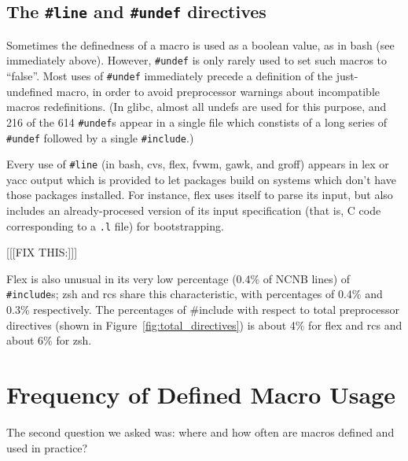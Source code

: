 \documentclass[11pt]{article}
\begin{document}
\subsection{The {\tt \#line} and {\tt \#undef} directives}

Sometimes the definedness of a macro is used as a boolean value, as in bash
(see immediately above).  However, {\tt \#undef} is only rarely used to set
such macros to ``false''.  Most uses of {\tt \#undef} immediately precede a
definition of the just-undefined macro, in order to avoid preprocessor
warnings about incompatible macros redefinitions.  (In glibc, almost all
undefs are used for this purpose, and 216 of the 614 {\tt \#undef}s appear
in a single file which constists of a long series of {\tt \#undef} followed
by a single {\tt \#include}.)

Every use of {\tt \#line} (in bash, cvs, flex, fvwm, gawk, and groff)
appears in lex or yacc output which is provided to let packages build on
systems which don't have those packages installed.  For instance, flex uses
itself to parse its input, but also includes an already-procesed version of
its input specification (that is, C code corresponding to a {\tt .l} file)
for bootstrapping.



[[[FIX THIS:]]]

Flex is also unusual in
its very low percentage (0.4\% of NCNB lines) of {\tt \#include}s; zsh and 
rcs share this characteristic, with percentages of 0.4\% and 0.3\%
respectively.  The percentages of {\#include} with respect to total
preprocessor directives (shown in Figure~\ref{fig:total_directives}) is
about 4\% for flex and rcs and about 6\% for zsh.


\section{Frequency of Defined Macro Usage}
\label{sec:usage}

The second question we asked was: where and how often are macros
defined and used in practice?  

%
%
\end{document}
